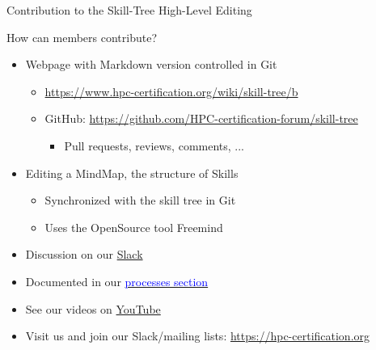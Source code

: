 \documentclass[compress,aspectratio=169]{beamer}
\newcommand{\hrefb}[2]{\href{#1}{\textcolor{blue}{#2}}}
\begin{document}
\begin{frame}{Contribution to the Skill-Tree High-Level Editing}

  \begin{block}{How can members contribute?}
  \begin{itemize}
    \item Webpage with Markdown version controlled in Git
      \begin{itemize}
        \item \url{https://www.hpc-certification.org/wiki/skill-tree/b}
        \item GitHub: \url{https://github.com/HPC-certification-forum/skill-tree}
        \begin{itemize}
          \item Pull requests, reviews, comments, ...
        \end{itemize}
      \end{itemize}
    \item Editing a MindMap, the structure of Skills
      \begin{itemize}
        \item Synchronized with the skill tree in Git
        \item Uses the OpenSource tool Freemind
      \end{itemize}
    \item Discussion on our \href{https://join.slack.com/t/hpc-certification/shared_invite/enQtMzUwNzU3NzM2MTkzLTAzZWM3NDg0N2I2ZmQwOWI5ZGUwNjNlNDgzM2RmOTM3ZWRjNjIxYTc5NzUxYTJhNmRlNmM5YmE1NDY3YzkzYzA}{Slack}
    \item Documented in our \hrefb{https://www.hpc-certification.org/processes/}{processes section}
    \item See our videos on \href{https://www.youtube.com/playlist?list=PL4b682pSp7MQbdhhvwisrPo7PjYya26_g}{YouTube}
    \item Visit us and join our Slack/mailing lists: \url{https://hpc-certification.org}
  \end{itemize}
  \end{block}
\end{frame}
\end{document}
